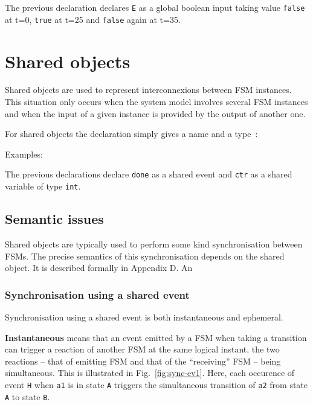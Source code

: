 The previous declaration declares \verb|E| as a global boolean input taking value \texttt{false} at
t=0, \texttt{true} at t=25 and \texttt{false} again at t=35.

\section{Shared objects}
\label{sec:shared}

Shared objects are used to represent interconnexions between FSM instances. This situation only
occurs when the system model involves several FSM instances and when the input of a given instance
is provided by the output of another one.

\step For shared objects the declaration simply gives a name and a type~:

\begin{center}
\end{center}

\medskip
Examples:

\begin{center}

\end{center}

The previous declarations declare \verb|done| as a shared event and \texttt{ctr} as a shared
variable of type \texttt{int}.

\subsection*{Semantic issues}

\medskip
Shared objects are typically used to perform some kind synchronisation between FSMs. The precise semantics
of this synchronisation depends on the shared object. It is described formally in Appendix D. An

\subsubsection*{Synchronisation using a shared event}
\label{sec:synchr-using-shar}

Synchronisation using a shared event is both instantaneous and ephemeral.

\textbf{Instantaneous} means that an event emitted by a FSM when taking a
transition can trigger a reaction of another FSM at the same logical instant, the two reactions -- that of
emitting FSM and that of the ``receiving'' FSM -- being simultaneous. 
This is illustrated in Fig.~\ref{fig:sync-ev1}. Here, each occurence of event \texttt{H} when
\texttt{a1} is in state \texttt{A} triggers the simultaneous transition of \texttt{a2} from state
\texttt{A} to state \texttt{B}.

